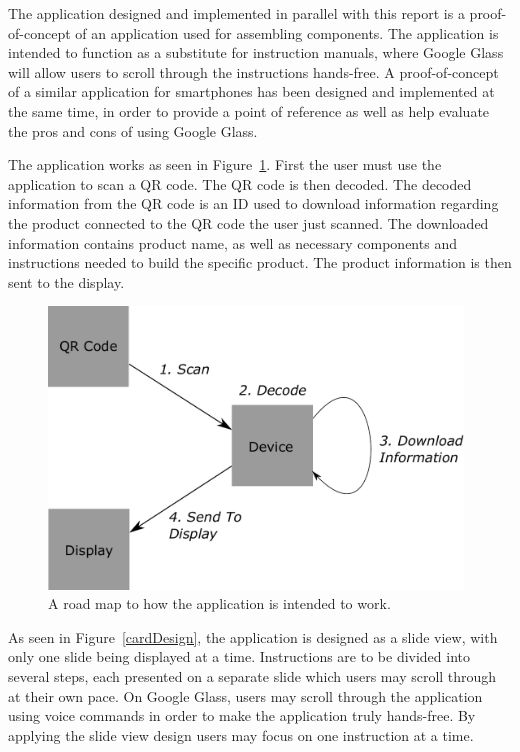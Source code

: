 The application designed and implemented in parallel with this report is a proof-of-concept of an application used for assembling components. The application is intended to function as a substitute for  instruction manuals, where Google Glass will allow users to scroll through the instructions hands-free. A proof-of-concept of a similar application for smartphones has been designed and implemented at the same time, in order to provide a point of reference as well as help evaluate the pros and cons of using Google Glass.

The application works as seen in Figure~\ref{projectmap}. First the user must use the application to scan a QR code. The QR code is then decoded. The decoded information from the QR code is an ID used to download information regarding the product connected to the QR code the user just scanned. The downloaded information contains product name, as well as necessary components and instructions needed to build the specific product. The product information is then sent to the display.

	\begin{figure}[ht!]
		\centering
		\includegraphics[width=110mm]{images/projectmap3}
		\caption{A road map to how the application is intended to work.}
		\label{projectmap}
	\end{figure}

As seen in Figure~\ref{cardDesign}, the application is designed as a slide view, with only one slide being displayed at a time. Instructions are to be divided into several steps, each presented on a separate slide which users may scroll through at their own pace. On Google Glass, users may scroll through the application using voice commands in order to make the application truly hands-free. By applying the slide view design users may focus on one instruction at a time. %

